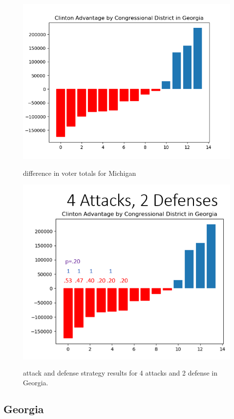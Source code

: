 \documentclass[letterpaper]{article} %
\begin{document}
\begin{figure}
    \includegraphics[width=\linewidth]{georgia_districts}
    \label{georgia_districts}
   \caption{difference in voter totals for Michigan}
\end{figure}

\begin{figure}
    \includegraphics[width=\linewidth]{4and2}
    \label{4and2}
    \caption{attack and defense strategy results for 4 attacks and 2 defense in Georgia.}
\end{figure}

\subsection{Georgia}
\end{document}

